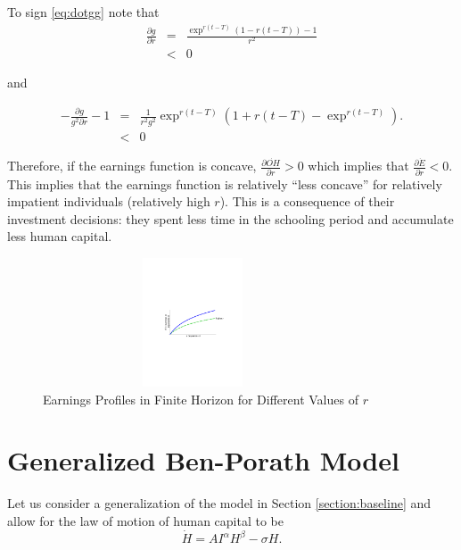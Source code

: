 \indent To sign \eqref{eq:dotgg} note that
\begin{eqnarray}
\frac{\partial g}{\partial r} &=& \frac{\exp^{r(t-T)} \left( 1 - r(t - T) \right) - 1 }{r^2} \nonumber \\
&<& 0 \label{eq:partialgr}
\end{eqnarray}

\noindent and

\begin{eqnarray}
- \frac{\partial g }{g^2 \partial r} - 1 &=& \frac{1}{r^2g^2} \exp^{r(t-T)} \left( 1 + r(t - T) - \exp^{r(t-T)} \right). \nonumber \\
&<& 0
\end{eqnarray}

\indent Therefore, if the earnings function is concave, $\frac{\partial \dot{OH}}{\partial r} > 0$ which implies that $\frac{\partial \dot{E}}{\partial r} < 0$. This implies that the earnings function is relatively ``less concave'' for relatively impatient individuals (relatively high $r$). This is a consequence of their investment decisions: they spent less time in the schooling period and accumulate less human capital.

\begin{center}
\begin{figure}[H]
\caption{Earnings Profiles in Finite Horizon for Different Values of $r$ }
\centering
\includegraphics[width=3.5in, height=1.5in]{Figures/fig-earnings-growth.pdf}
\end{figure}
\end{center}
 
\section{Generalized Ben-Porath Model} \label{section:generalized}
Let us consider a generalization of the model in Section \ref{section:baseline} and allow for the law of motion of human capital to be
\begin{equation}
\dot{H} = A I^{\alpha} H^{\beta} - \sigma H \label{eq:lawhgen}.
\end{equation}

